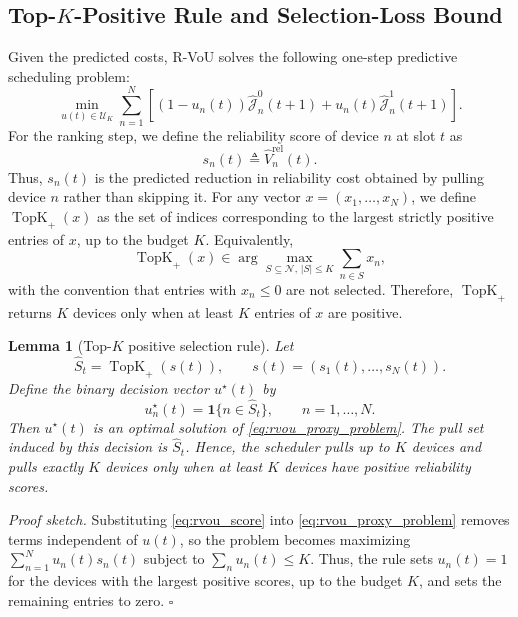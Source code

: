 \documentclass[conference]{IEEEtran}
\newtheorem{lemma}[theorem]{Lemma}
\begin{document}
\subsection{Top-\(K\)-Positive Rule and Selection-Loss Bound}
\vspace{-0.5mm}
Given the predicted costs, R-VoU solves the following one-step predictive
scheduling problem:
\vspace{-0.1mm}
\begin{equation}
\label{eq:rvou_proxy_problem}
\min_{u(t)\in\mathcal U_K}
\sum_{n=1}^{N}
\left[
(1-u_n(t))\widehat{\mathcal J}_n^0(t+1)
+
u_n(t)\widehat{\mathcal J}_n^1(t+1)
\right].
\end{equation}
For the ranking step, we define the reliability score of device \(n\) at slot
\(t\) as
\vspace{-2mm}
\[
s_n(t)\triangleq \widehat V_n^{\mathrm{rel}}(t).
\]
Thus, \(s_n(t)\) is the predicted reduction in reliability cost obtained by
pulling device \(n\) rather than skipping it. For any vector
\(x=(x_1,\ldots,x_N)\), we define \(\operatorname{TopK}_{+}(x)\) as the set of
indices corresponding to the largest strictly positive entries of \(x\), up to
the budget \(K\). Equivalently,
\vspace{-1mm}
\[
\operatorname{TopK}_{+}(x)
\in
\arg\max_{S\subseteq\mathcal N,\, |S|\le K}
\sum_{n\in S}x_n,
\]
with the convention that entries with \(x_n\le 0\) are not selected. Therefore, \(\operatorname{TopK}_{+}\) returns \(K\)
devices only when at least \(K\) entries of \(x\) are positive.
\vspace{-2.1mm}
\begin{lemma}[Top-\(K\) positive selection rule]
\label{lem:rvou_topk}
Let
\[
\widehat S_t=\operatorname{TopK}_{+}(s(t)),
\qquad
s(t)=(s_1(t),\ldots,s_N(t)).
\]
Define the binary decision vector \(u^\star(t)\) by
\vspace{-1mm}
\[
u_n^\star(t)=\mathbf 1\{n\in \widehat S_t\},
\qquad n=1,\ldots,N.
\]
Then \(u^\star(t)\) is an optimal solution of \eqref{eq:rvou_proxy_problem}. The pull set induced
by this decision is \(\widehat S_t\). Hence, the scheduler pulls up to \(K\)
devices and pulls exactly \(K\) devices only when at least \(K\) devices have
positive reliability scores.
\end{lemma}
\vspace{-1mm}
\noindent\emph{Proof sketch.}
Substituting \eqref{eq:rvou_score} into \eqref{eq:rvou_proxy_problem}
removes terms independent of \(u(t)\), so the problem becomes maximizing
\(\sum_{n=1}^{N}u_n(t)s_n(t)\) subject to \(\sum_n u_n(t)\le K\).
Thus, the rule sets \(u_n(t)=1\) for the devices with the largest positive
scores, up to the budget \(K\), and sets the remaining entries to zero.
\(\square\)
\end{document}
